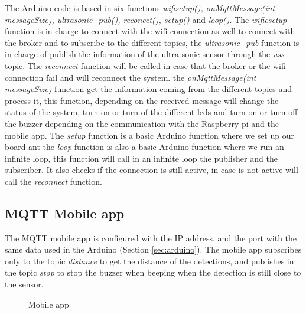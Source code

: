 \documentclass[12pt]{article}
\begin{document}
The Arduino code is based in six functions \textit{wifisetup(), onMqttMessage(int messageSize), ultrasonic\_pub(), reconect(), setup()} and \textit{loop()}. The \textit{wifiesetup} function is in charge to connect with the wifi connection as well to connect with the broker and to subscribe to the different topics, the \textit{ultrasonic\_pub}  function is in charge of publish the information of the ultra sonic sensor through the \textit{uss} topic. The \textit{reconnect} function will be called in case that the broker or the wifi connection fail and will reconnect the system. the \textit{onMqttMessage(int messageSize)} function get the information coming from the different topics and process it, this function, depending on the received message will change the status of the system, turn on or turn of the different leds and turn on or turn off the buzzer depending on the communication with the Raspberry pi and the mobile app. The \textit{setup} function is a basic Arduino function where we set up our board ant the \textit{loop} function is also a basic Arduino function where we run an infinite loop, this function will call in an infinite loop the publisher and the subscriber. It also checks if the connection is still active, in case is not active will call the \textit{reconnect} function.

\subsection{MQTT Mobile app}

The MQTT mobile app is configured with the IP address, and the port with the same data used in the Arduino (Section \ref{sec:arduino}). The mobile app subscribes only to the topic \textit{distance} to get the distance of the detections, and publishes in the topic \textit{stop} to stop the buzzer when beeping when the detection is still close to the sensor.

\begin{figure}[h]
\caption{Mobile app}
\label{fig:phone1}
\end{figure}
\end{document}
